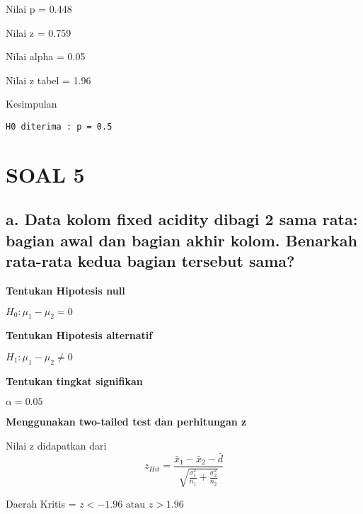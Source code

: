 \documentclass[11pt]{article}
\begin{document}
    Nilai p = 0.448

    
    Nilai z = 0.759

    
    Nilai alpha = 0.05

    
    Nilai z tabel = 1.96

    
    Kesimpulan

    
    \begin{Verbatim}[commandchars=\\\{\}]
H0 diterima : p = 0.5
    \end{Verbatim}

    \hypertarget{soal-5}{%
\section{SOAL 5}\label{soal-5}}

    \hypertarget{a.-data-kolom-fixed-acidity-dibagi-2-sama-rata-bagian-awal-dan-bagian-akhir-kolom.-benarkah-rata-rata-kedua-bagian-tersebut-sama}{%
\subsection{a. Data kolom fixed acidity dibagi 2 sama rata: bagian awal
dan bagian akhir kolom. Benarkah rata-rata kedua bagian tersebut
sama?}\label{a.-data-kolom-fixed-acidity-dibagi-2-sama-rata-bagian-awal-dan-bagian-akhir-kolom.-benarkah-rata-rata-kedua-bagian-tersebut-sama}}

    \textbf{Tentukan Hipotesis null}

\(H_0 : \mu_1-\mu_2 = 0\)

\textbf{Tentukan Hipotesis alternatif}

\(H_1 : \mu_1-\mu_2 \neq 0\)

\textbf{Tentukan tingkat signifikan}

\(\alpha = 0.05\)

\textbf{Menggunakan two-tailed test dan perhitungan z}

Nilai z didapatkan dari
\[ z_{Hit} = \frac{\bar{x}_1-\bar{x}_2 - \bar{d}}{\sqrt{\frac{\sigma_1^2}{n_1} + \frac{\sigma_2^2}{n_2}}}\]

Daerah Kritis = \(z < -1.96 \text{ atau } z > 1.96\)
\end{document}
